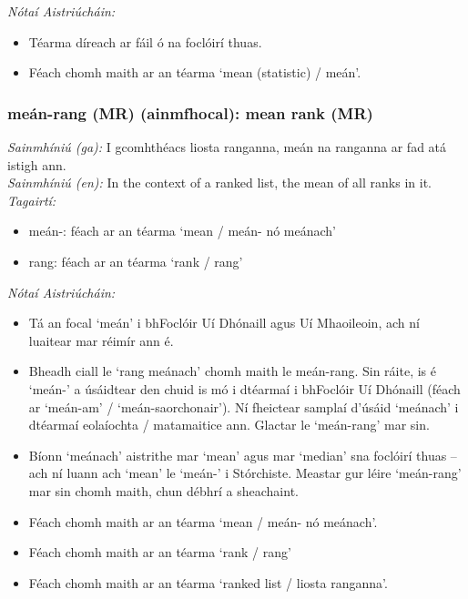  \noindent \textit{Nótaí Aistriúcháin:}
\begin{itemize}
	\item Téarma díreach ar fáil ó na foclóirí thuas.
	\item Féach chomh maith ar an téarma `mean (statistic) / meán'.
\end{itemize}


\subsubsection*{meán-rang (MR) (ainmfhocal): mean rank (MR)}
 \noindent \textit{Sainmhíniú (ga):} I gcomhthéacs liosta ranganna, meán na ranganna ar fad atá istigh ann.
\\
 \noindent \textit{Sainmhíniú (en):} In the context of a ranked list, the mean of all ranks in it.
\\
 \noindent \textit{Tagairtí:}
\begin{itemize}
	\item meán-: féach ar an téarma `mean / meán- nó meánach'
	\item rang: féach ar an téarma `rank / rang'
\end{itemize}

 \noindent \textit{Nótaí Aistriúcháin:}
\begin{itemize}
	\item Tá an focal `meán' i bhFoclóir Uí Dhónaill agus Uí Mhaoileoin, ach ní luaitear mar réimír ann é.
	\item Bheadh ciall le `rang meánach' chomh maith le meán-rang. Sin ráite, is é `meán-' a úsáidtear den chuid is mó i dtéarmaí i bhFoclóir Uí Dhónaill (féach ar `meán-am' / `meán-saorchonair'). Ní fheictear samplaí d'úsáid `meánach' i dtéarmaí eolaíochta / matamaitice ann. Glactar le `meán-rang' mar sin.
	\item Bíonn `meánach' aistrithe mar `mean' agus mar `median' sna foclóirí thuas -- ach ní luann ach `mean' le `meán-' i Stórchiste. Meastar gur léire `meán-rang' mar sin chomh maith, chun débhrí a sheachaint.
	\item Féach chomh maith ar an téarma `mean / meán- nó meánach'.
	\item Féach chomh maith ar an téarma `rank / rang'
	\item Féach chomh maith ar an téarma `ranked list / liosta ranganna'.
\end{itemize}



